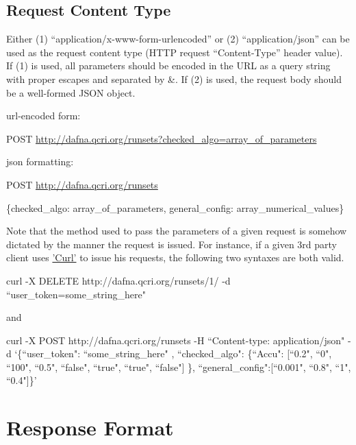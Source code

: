 \documentclass[a4paper,10pt]{scrartcl}
\begin{document}
\subsection{Request Content Type}
Either (1) ``application/x-www-form-urlencoded” or (2) ``application/json” can be used as the request content type (HTTP request “Content-Type” header value). 
If (1) is used, all parameters should be encoded in the URL as a query string with proper escapes and separated by \&. If (2) is used, the request body should 
be a well-formed JSON object. 

\begin{description}
 \item url-encoded form:
 \item POST \href{http://dafna.qcri.org/runsets?checked\_algo=array\_of\_parameters}{http://dafna.qcri.org/runsets?checked\_algo=array\_of\_parameters}
 \item json formatting:
 \item POST \href{http://dafna.qcri.org/runsets}{http://dafna.qcri.org/runsets}
 \item \{checked\_algo: array\_of\_parameters, general\_config: array\_numerical\_values\}
\end{description}


Note that the method used to pass the parameters of a given request is somehow dictated by the manner the request is issued.
For instance, if a given 3rd party client uses
\href{http://curl.haxx.se/}{'Curl'} to issue his requests, the following two syntaxes are both valid.
\begin{description}
 \item curl -X DELETE http://dafna.qcri.org/runsets/1/ -d ``user\_token=some\_string\_here"\\
 \item and \\
 \item curl -X POST http://dafna.qcri.org/runsets -H ``Content-type: application/json" -d `\{``user\_token": ``some\_string\_here" , ``checked\_algo": \{``Accu": [``0.2", ``0", ``100", ``0.5", ``false", ``true", ``true", ``false"] \}, ``general\_config":[``0.001", ``0.8", ``1", ``0.4"]\}' 
\end{description}
\section{Response Format}
\end{document}
